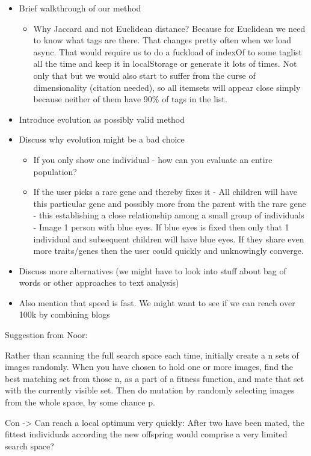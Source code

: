 \documentclass[]{article}
\begin{document}
\begin{itemize}
\item Brief walkthrough of our method
	\begin{itemize}
	\item Why Jaccard and not Euclidean distance? Because for Euclidean we need to know what tags are there. That changes pretty often when we load async. That would require us to do a fuckload of indexOf to some taglist all the time and keep it in localStorage or generate it lots of times. Not only that but we would also start to suffer from the curse of dimensionality (citation needed), so all itemsets will appear close simply because neither of them have 90\% of tags in the list.
	\end{itemize}
\item Introduce evolution as possibly valid method
\item Discuss why evolution might be a bad choice
	\begin{itemize}
	\item If you only show one individual - how can you evaluate an entire population?
	\item If the user picks a rare gene and thereby fixes it - All children will have this particular gene and possibly more from the parent with the rare gene - this establishing a close relationship among a small group of individuals - Image 1 person with blue eyes. If blue eyes is fixed then only that 1 individual and subsequent children will have blue eyes. If they share even more traits/genes then the user could quickly and unknowingly converge.
	\end{itemize}
\item Discuss more alternatives (we might have to look into stuff about bag of words or other approaches to text analysis)
\item Also mention that speed is fast. We might want to see if we can reach over 100k by combining blogs
\end{itemize}
Suggestion from Noor:

Rather than scanning the full search space each time, initially create a n sets of images randomly.  When you have chosen to hold one or more images, find the best matching set from those n, as a part of a fitness function, and mate that set with the currently visible set.  Then do mutation by randomly selecting images from the whole space, by some chance p.


Con ->  Can reach a local optimum very quickly:  After two have been mated, the fittest individuals according the new offspring would comprise a very limited search space?
\end{document}
